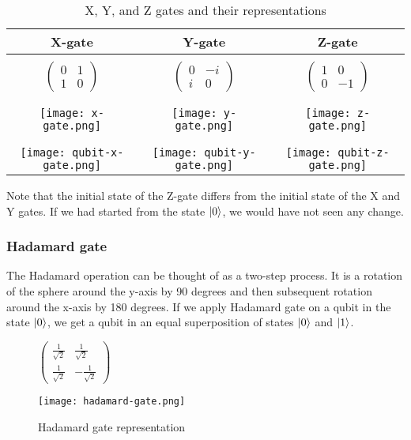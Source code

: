 \begin{table}[H]
  \centering
  \begin{tabular}{|c|c|c|} 
      \hline
      \textbf{X-gate} & \textbf{Y-gate} & \textbf{Z-gate}\\
      \hline
      &&\\[0.5pt]
      $\begin{pmatrix}
        0 & 1 \\
        1 & 0
      \end{pmatrix}$ & 
      $\begin{pmatrix}
        0 & -i \\
        i & 0
      \end{pmatrix}$ &
      $\begin{pmatrix}
        1 & 0 \\
        0 & -1
      \end{pmatrix}$\\
      &&\\[0.5pt]
      \hline
      &&\\[0.5pt]
      \texttt{[image: x-gate.png]} & \texttt{[image: y-gate.png]}  & \texttt{[image: z-gate.png]}\\
      &&\\[0.5pt]
      \hline
      &&\\[0.5pt]
      \texttt{[image: qubit-x-gate.png]} & \texttt{[image: qubit-y-gate.png]} & \texttt{[image: qubit-z-gate.png]}\\
      \hline
  \end{tabular}
  \caption{X, Y, and Z gates and their representations}
  \label{tab:xyz-gates}
\end{table}
Note that the initial state of the Z-gate differs from the initial state of the X and Y gates. If we had started from the state $\lvert0\rangle$, we would have not seen any change.

\subsubsection*{Hadamard gate}
The Hadamard operation can be thought of as a two-step process. It is a rotation of the sphere around the y-axis by 90 degrees and then subsequent rotation around the x-axis by 180 degrees. If we apply Hadamard gate on a qubit in the state $\lvert0\rangle$, we get a qubit in an equal superposition of states $\lvert0\rangle$ and $\lvert1\rangle$.
\begin{figure}[H]
    \centering
    \begin{minipage}{0.4\linewidth}
      \centering
      $\begin{pmatrix} 
        \frac{1}{\sqrt{2}} &  \frac{1}{\sqrt{2}}  \\
        \frac{1}{\sqrt{2}}  &  -\frac{1}{\sqrt{2}} 
        \end{pmatrix}$
    \end{minipage}
    \begin{minipage}{0.25\linewidth}
      \centering
      \texttt{[image: hadamard-gate.png]}
    \end{minipage}
    \caption{Hadamard gate representation}
\end{figure}

